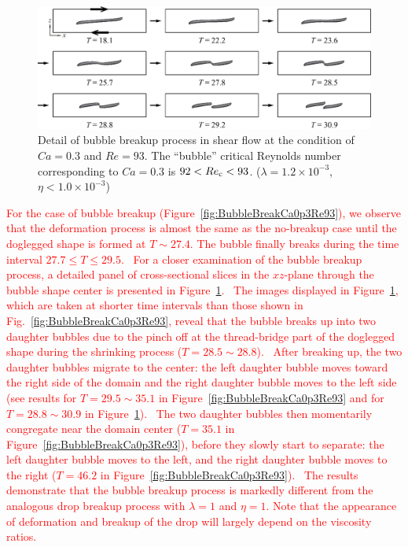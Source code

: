 \documentclass{elsarticle}
\begin{document}
%
\begin{figure}%
  \centering
  \includegraphics[width=\textwidth]{Figure/7-BubBreakCa0p3Re93Detail}
  \caption{Detail of bubble breakup process in shear flow at the condition
           of $Ca=0.3$ and $Re=93$.
	   The ``bubble'' 
	   critical Reynolds number corresponding to $Ca=0.3$ is
	   $92<Re_{\rm c}<93$.
           ($\lambda = 1.2 \times 10^{-3}$, $\eta < 1.0 \times 10^{-3}$) 
	   }
  \label{fig:BubBreakCa0p3Re93Detail}
\end{figure}
%
\textcolor{red}
{
For the case of bubble breakup (Figure~\ref{fig:BubbleBreakCa0p3Re93}), we observe that the deformation process is almost the same as the no-breakup case until the doglegged shape is formed at $T \sim 27.4$. The bubble finally breaks during the time interval $27.7 \leq T \leq 29.5$.  For a closer examination of the bubble breakup process, a detailed panel of cross-sectional slices in the $xz$-plane through the bubble shape center is presented in Figure~\ref{fig:BubBreakCa0p3Re93Detail}.  The images displayed in Figure~\ref{fig:BubBreakCa0p3Re93Detail}, which are taken at shorter time intervals than those shown in Fig.~\ref{fig:BubbleBreakCa0p3Re93}, reveal that the bubble breaks up into two daughter bubbles due to the pinch off at the thread-bridge part of the doglegged shape during the shrinking process ($T = 28.5 \sim 28.8$).  After breaking up, the two daughter bubbles migrate to the center: the left daughter bubble moves toward the right side of the domain and the right daughter bubble moves to the left side (see results for $T = 29.5 \sim 35.1$ in Figure~\ref{fig:BubbleBreakCa0p3Re93} and for $T = 28.8 \sim 30.9$ in Figure~\ref{fig:BubBreakCa0p3Re93Detail}).  The two daughter bubbles then momentarily congregate near the domain center ($T = 35.1$ in Figure~\ref{fig:BubbleBreakCa0p3Re93}), before they slowly start to separate: the left daughter bubble moves to the left, and the right daughter bubble moves to the right ($T = 46.2$ in Figure~\ref{fig:BubbleBreakCa0p3Re93}).  The results demonstrate that the bubble breakup process is markedly different from the analogous drop breakup process with $\lambda = 1$ and $\eta =1$. Note that the appearance of deformation and breakup of the drop will largely depend on the viscosity ratios.  
}
\end{document}
